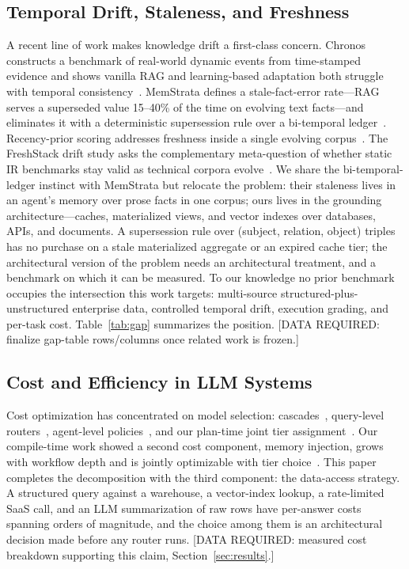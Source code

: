\documentclass{ieeeaccess}
\begin{document}
\subsection{Temporal Drift, Staleness, and Freshness}
A recent line of work makes knowledge drift a first-class concern. Chronos
constructs a benchmark of real-world dynamic events from time-stamped evidence and
shows vanilla RAG and learning-based adaptation both struggle with temporal
consistency~\cite{chronos}. MemStrata defines a stale-fact-error rate---RAG serves
a superseded value 15--40\% of the time on evolving text facts---and eliminates it
with a deterministic supersession rule over a bi-temporal ledger~\cite{memstrata}.
Recency-prior scoring addresses freshness inside a single evolving
corpus~\cite{recency}. The FreshStack drift study asks the complementary
meta-question of whether static IR benchmarks stay valid as technical corpora
evolve~\cite{freshstack}. We share the bi-temporal-ledger instinct with
MemStrata but relocate the problem: their staleness lives in an agent's memory
over prose facts in one corpus; ours lives in the grounding architecture---caches,
materialized views, and vector indexes over databases, APIs, and documents. A
supersession rule over (subject, relation, object) triples has no purchase on a
stale materialized aggregate or an expired cache tier; the architectural version
of the problem needs an architectural treatment, and a benchmark on which it can
be measured. To our knowledge no prior benchmark occupies the intersection this
work targets: multi-source structured-plus-unstructured enterprise data,
controlled temporal drift, execution grading, and per-task cost.
Table~\ref{tab:gap} summarizes the position. [DATA REQUIRED: finalize gap-table
rows/columns once related work is frozen.]

\subsection{Cost and Efficiency in LLM Systems}
Cost optimization has concentrated on model selection: cascades~\cite{frugalgpt},
query-level routers~\cite{routellm, hybridllm}, agent-level policies~\cite{masrouter},
and our plan-time joint tier assignment~\cite{par}. Our compile-time work showed a
second cost component, memory injection, grows with workflow depth and is jointly
optimizable with tier choice~\cite{tca}. This paper completes the decomposition
with the third component: the data-access strategy. A structured query against a
warehouse, a vector-index lookup, a rate-limited SaaS call, and an LLM summarization
of raw rows have per-answer costs spanning orders of magnitude, and the choice among
them is an architectural decision made before any router runs. [DATA REQUIRED:
measured cost breakdown supporting this claim, Section~\ref{sec:results}.]
\end{document}

